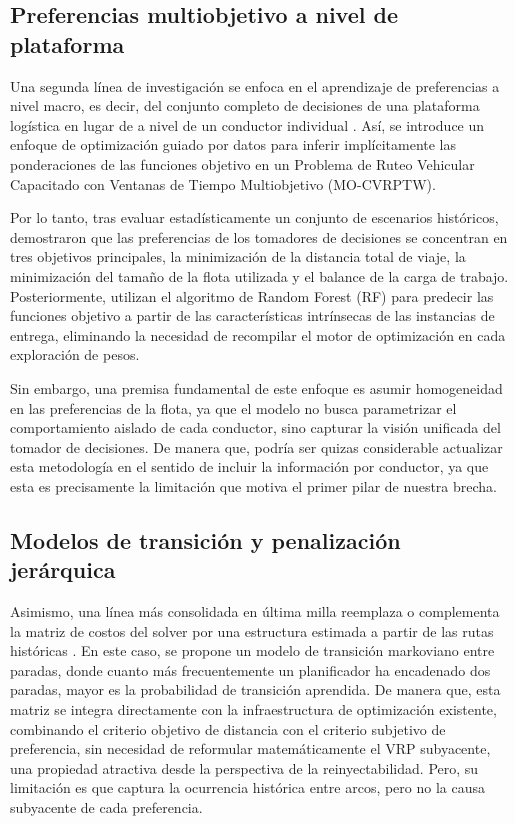 \subsection{Preferencias multiobjetivo a nivel de plataforma}

Una segunda línea de investigación se enfoca en el aprendizaje de preferencias a nivel macro, es decir, del conjunto completo de decisiones de una plataforma logística en lugar de a nivel de un conductor individual \cite{nourmohammadi2025data}. Así, se introduce un enfoque de optimización guiado por datos para inferir implícitamente las ponderaciones de las funciones objetivo en un Problema de Ruteo Vehicular Capacitado con Ventanas de Tiempo Multiobjetivo (MO-CVRPTW). 

Por lo tanto, tras evaluar estadísticamente un conjunto de escenarios históricos, demostraron que las preferencias de los tomadores de decisiones se concentran en tres objetivos principales, la minimización de la distancia total de viaje, la minimización del tamaño de la flota utilizada y el balance de la carga de trabajo. Posteriormente, utilizan el algoritmo de Random Forest (RF) para predecir las funciones objetivo a partir de las características intrínsecas de las instancias de entrega, eliminando la necesidad de recompilar el motor de optimización en cada exploración de pesos.

Sin embargo, una premisa fundamental de este enfoque es asumir homogeneidad en las preferencias de la flota, ya que el modelo no busca parametrizar el comportamiento aislado de cada conductor, sino capturar la visión unificada del tomador de decisiones. De manera que, podría ser quizas considerable actualizar esta metodología en el sentido de incluir la información por conductor, ya que esta es precisamente la limitación que motiva el primer pilar de nuestra brecha.

\subsection{Modelos de transición y penalización jerárquica}

Asimismo, una línea más consolidada en última milla reemplaza o complementa la matriz de costos del solver por una estructura estimada a partir de las rutas históricas \cite{canoy2023learn}. En este caso, se propone un modelo de transición markoviano entre paradas, donde cuanto más frecuentemente un planificador ha encadenado dos paradas, mayor es la probabilidad de transición aprendida. De manera que, esta matriz se integra directamente con la infraestructura de optimización existente, combinando el criterio objetivo de distancia con el criterio subjetivo de preferencia, sin necesidad de reformular matemáticamente el VRP subyacente, una propiedad atractiva desde la perspectiva de la reinyectabilidad. Pero, su limitación es que captura la ocurrencia histórica entre arcos, pero no la causa subyacente de cada preferencia.


